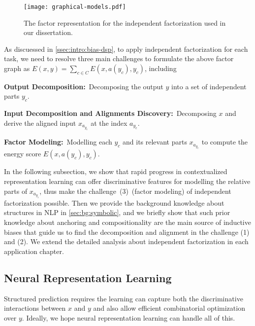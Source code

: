 \begin{figure}[!tbp]
\begin{center}
\texttt{[image: graphical-models.pdf]}
\end{center}
\caption{\label{fig:bg:graphical-model}The factor representation for
  the independent factorization used in our dissertation.}
\end{figure}

As discuessed in \autoref{ssec:intro:bias-dsp}, to apply independent
factorization for each task, we need to resolve three main challenges
to formulate the above factor graph as
$E(x, y) = \sum_{c \in C}E(x, a(y_{c}), y_{c})$, including
\begin{inparaenum}[(1)]
\item \textbf{Output Decomposition:}~Decomposing the output $y$ into a set of independent parts
  $y_{c}$.
\item \textbf{Input Decomposition and Alignments Discovery:}~Decomposing $x$ and derive the aligned input $x_{a_{y_{c}}}$ at
  the index $a_{y_{c}}$.
\item \textbf{Factor Modeling:}~Modelling each $y_{c}$ and its
  relevant parts $x_{a_{y_{c}}}$ to compute the energy score
  $E(x, a(y_{c}), y_{c})$.
\end{inparaenum}

In the following subsection, we show that rapid progress in
contextualized representation learning can offer discriminative
features for modelling the relative parts of $x_{a_{y_{c}}}$, thus
make the challenge~(3)~(factor modeling) of independent factorization possible. Then we
provide the background knowledge about structures in NLP in
\autoref{sec:bg:symbolic}, and we briefly show that such prior
knowledge about anchoring and compositionality are the main source of
inductive biases that guide us to find the decomposition and alignment
in the challenge (1) and (2). We extend the detailed analysis about
independent factorization in each application chapter.

\subsection{Neural Representation Learning}
\label{ssec:bg:rep-learning}

Structured prediction requires the learning can capture both the
discriminative interactions between $x$ and $y$ and also allow
efficient combinatorial optimization over $y$. Ideally, we hope neural
representation learning can handle all of this.


